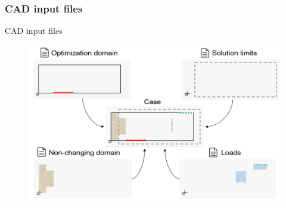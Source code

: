 \subsubsection{CAD input files}
\begin{frame}{CAD input files}

\begin{figure}
\centering
\includegraphics[width=.84\textwidth]{Pictures/SecondHalf/four_files.png}
\end{figure}
\end{frame}

